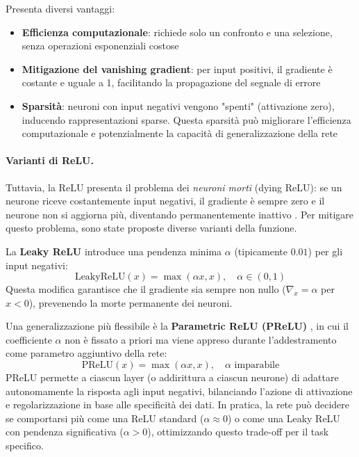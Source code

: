 Presenta diversi vantaggi:
\begin{itemize}
\item \textbf{Efficienza computazionale}: richiede solo un confronto e una selezione, senza operazioni esponenziali costose
\item \textbf{Mitigazione del vanishing gradient}: per input positivi, il gradiente è costante e uguale a 1, facilitando la propagazione del segnale di errore \cite{glorot2011deep}
\item \textbf{Sparsità}: neuroni con input negativi vengono "spenti" (attivazione zero), inducendo rappresentazioni sparse. Questa sparsità può migliorare l'ef\-fi\-cien\-za computazionale e potenzialmente la capacità di generalizzazione della rete \cite{glorot2011deep}
\end{itemize} 


\paragraph{Varianti di ReLU.}
Tuttavia, la ReLU presenta il problema dei \textit{neuroni morti} (dying ReLU): se un neurone riceve costantemente input negativi, il gradiente è sempre zero e il neurone non si aggiorna più, diventando permanentemente inattivo \cite{he2015delving}. Per mitigare questo problema, sono state proposte diverse varianti della funzione.

La \textbf{Leaky ReLU} \cite{maas2013rectifier} introduce una pendenza minima \(\alpha\) (tipicamente \(0.01\)) per gli input negativi:
\[
\text{LeakyReLU}(x) = \max(\alpha x, x), \quad \alpha \in (0,1)
\]
Questa modifica garantisce che il gradiente sia sempre non nullo (\(\nabla_x = \alpha\) per \(x < 0\)), prevenendo la morte permanente dei neuroni.

Una generalizzazione più flessibile è la \textbf{Parametric ReLU (PReLU)} \cite{he2015delving}, in cui il coefficiente \(\alpha\) non è fissato a priori ma viene appreso durante l'ad\-des\-tra\-men\-to come parametro aggiuntivo della rete:
\[
\text{PReLU}(x) = \max(\alpha x, x), \quad \alpha \text{ imparabile}
\]
PReLU permette a ciascun layer (o addirittura a ciascun neurone) di adattare autonomamente la risposta agli input negativi, bilanciando l'azione di attivazione e regolarizzazione in base alle specificità dei dati. In pratica, la rete può decidere se comportarsi più come una ReLU standard (\(\alpha \approx 0\)) o come una Leaky ReLU con pendenza significativa (\(\alpha > 0\)), ottimizzando questo trade-off per il task specifico.


